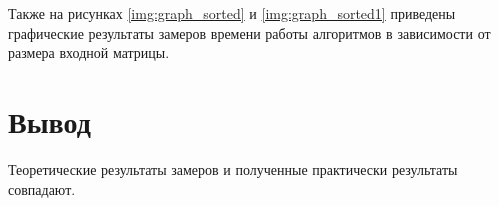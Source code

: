 Также на рисунках \ref{img:graph_sorted} и \ref{img:graph_sorted1} приведены графические результаты замеров времени работы алгоритмов в зависимости от размера входной матрицы.

\begin{center}
	\label{img:graph_sorted}
\end{center}
\newpage

\begin{center}
	\label{img:graph_sorted1}
\end{center}
\newpage


\section*{Вывод}


Теоретические результаты замеров и полученные практически результаты совпадают.